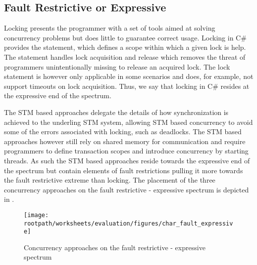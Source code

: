 \subsection{Fault Restrictive or Expressive}
Locking presents the programmer with a set of tools aimed at solving concurrency problems but does little to guarantee correct usage. Locking in C\# provides the  statement\cite[p. 102]{csharp2013specificaiton}, which defines a scope within which a given lock is help. The  statement handles lock acquisition and release which removes the threat of programmers unintentionally missing to release an acquired lock. The lock statement is however only applicable in some scenarios and does, for example, not support timeouts on lock acquisition. Thus, we say that locking in C\# resides at the expressive end of the spectrum.

The \ac{STM} based approaches delegate the details of how synchronization is achieved to the underling \ac{STM} system, allowing \ac{STM} based concurrency to avoid some of the errors associated with locking, such as deadlocks. The \ac{STM} based approaches however still rely on shared memory for communication and require programmers to define transaction scopes and introduce concurrency by starting threads. As such the \ac{STM} based approaches reside towards the expressive end of the spectrum but contain elements of fault restrictions pulling it more towards the fault restrictive extreme than locking. The placement of the three concurrency approaches on the fault restrictive - expressive spectrum is depicted in  . 
\begin{figure}[htbp]
\centering
 \texttt{[image: \\rootpath/worksheets/evaluation/figures/char\_fault\_expressive]} 
 \caption{Concurrency approaches on the fault restrictive - expressive spectrum}
\label{fig:char_fault_expressive}
\end{figure}

